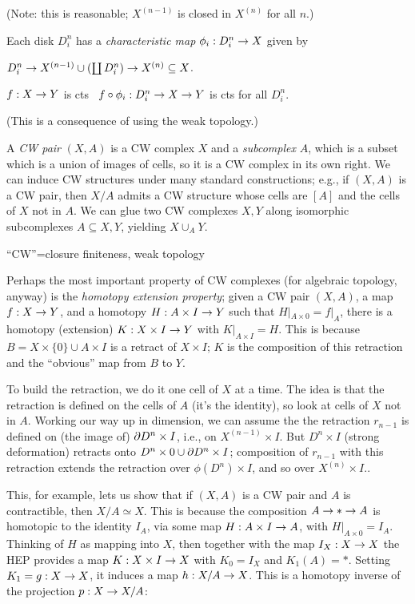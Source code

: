 (Note: this is reasonable;
$X^{(n-1)}$ is closed in $X^{(n)}$ for all $n$.)

\ssk

Each disk $D^n_i$ has a {\it characteristic map} $\phi_i:D^n_i\rightarrow X$
given by 

$D^n_i\rightarrow X^{(n-1)}\cup(\coprod D^n_i)\rightarrow X^{(n)}\subseteq X$.

$f:X\rightarrow Y$ is cts \lra\ $f\circ \phi_i:D^n_i\rightarrow X\rightarrow Y$ is cts for 
all $D^n_i$. 

(This is a consequence of using the weak topology.) 

\msk

A {\it CW pair} $(X,A)$ is a CW complex $X$ and a {\it subcomplex}
$A$, which is a subset which is a union of images of cells, so it is 
a CW complex in its own right. We can induce CW structures under
many standard constructions; e.g., if $(X,A)$ is a CW pair, then
$X/A$ admits a CW structure whose cells are $[A]$ and the cells of 
$X$ not in $A$. We can glue two CW complexes $X,Y$ along isomorphic
subcomplexes $A\subseteq X,Y$, yielding $X\cup_AY$.

\msk

``CW''=closure finiteness, weak topology

\vfill
\eject

Perhaps the most important property of CW complexes (for algebraic topology,
anyway) is the {\it homotopy extension property}; given a CW pair
$(X,A)$, a map $f:X\rightarrow Y$, and a homotopy $H:A\times I\rightarrow Y$ such that
$H|_{A\times 0}=f|_A$, there is a homotopy (extension)
$K:X\times I\rightarrow Y$ with $K|_{A\times I}=H$. This is because 
$B=X\times\{0\}\cup A\times I$ is a retract of $X\times I$; $K$ is the 
composition of this retraction and the ``obvious'' map from $B$ to $Y$.

\ssk

To build the retraction, we do it one cell of $X$ at a time. The idea is that
the retraction is defined on the cells of $A$ (it's the identity), so look
at cells of $X$ not in $A$. Working our way up in dimension, we can assume
the the retraction $r_{n-1}$
is defined on (the image of) $\partial D^n\times I$, i.e., on $X^{(n-1)}\times I$.
But $D^n\times I$ (strong deformation) retracts onto 
$D^n\times 0\cup \partial D^n\times I$; composition of $r_{n-1}$ with 
this retraction extends the retraction over $\phi(D^n)\times I$, and 
so over $X^{(n)}\times I$..

\msk

This, for example, lets us show that if $(X,A)$ is a CW pair and 
$A$ is contractible, then $X/A\simeq X$. This is because the
composition $A\rightarrow *\rightarrow A$ is homotopic to the identity $I_A$, via some map
$H:A\times I\rightarrow A$, with $H|_{A\times 0}=I_A$. Thinking of $H$ as
mapping into $X$, then together with the map $I_X:X\rightarrow X$ the HEP
provides a map $K:X\times I\rightarrow X$ with $K_0=I_X$ and $K_1(A)=*$.
Setting $K_1=g:X\rightarrow X$, it induces a map $h:X/A\rightarrow X$. This is a homotopy
inverse of the projection $p:X\rightarrow X/A$:

